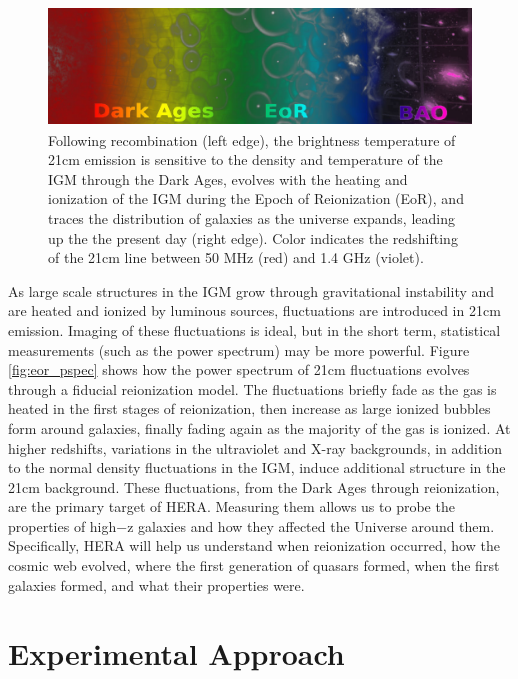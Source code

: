 \documentclass[preprint]{aastex}
\begin{document}
\begin{figure}[!ht]\centering
\includegraphics[height=1.25in]{plots/21cm_cosmo.jpg}
\caption{\small
Following recombination (left edge), the brightness temperature
of 21cm emission is sensitive to the density and temperature of the IGM
through the Dark Ages, evolves with the heating and
ionization of the IGM during the Epoch of Reionization (EoR), and
traces the distribution of galaxies as the universe expands,
leading up the the present day (right edge).  Color indicates
the redshifting of the 21cm line between 50 MHz (red) and 1.4 GHz (violet).
}\label{fig:21cm_cosmo}
\end{figure}

As large scale structures in the IGM grow through gravitational
instability and are heated and ionized by luminous sources, fluctuations
are introduced in 21cm emission.  
Imaging of these fluctuations is ideal, but in the short term, statistical
measurements (such as the power spectrum) may be more powerful.  Figure
\ref{fig:eor_pspec} shows how the power spectrum of 21cm fluctuations
evolves through a fiducial reionization model. The fluctuations briefly
fade as the gas is heated in the first stages of
reionization, then increase as large ionized bubbles form around galaxies, finally fading again
as the majority of the gas is ionized. At higher redshifts, variations in the ultraviolet and
X-ray backgrounds, in addition to the normal density fluctuations in the IGM,
induce additional structure in the 21cm background. These fluctuations, from the Dark Ages
through reionization, are the primary target of HERA. Measuring them allows us to
probe the properties of high−z galaxies and how they affected the Universe
around them.  Specifically, HERA will help us understand when reionization
occurred, how the cosmic web evolved, where the first generation of quasars
formed, when the first galaxies formed, and what their properties were.

\vspace{-0.25in}
\section{Experimental Approach}
\end{document}
